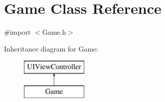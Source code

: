 \hypertarget{interface_game}{}\section{Game Class Reference}
\label{interface_game}


{\ttfamily \#import $<$Game.\+h$>$}

Inheritance diagram for Game\+:\begin{figure}[H]
\begin{center}
\leavevmode
\includegraphics[height=2.000000cm]{interface_game}
\end{center}
\end{figure}
